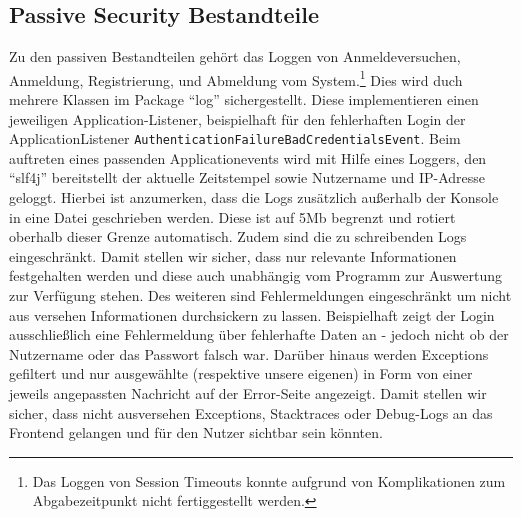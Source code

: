 \subsection{Passive Security Bestandteile}
Zu den passiven Bestandteilen gehört das Loggen von Anmeldeversuchen, Anmeldung, Registrierung, und Abmeldung vom System.\footnote{Das Loggen von Session Timeouts konnte aufgrund von Komplikationen zum Abgabezeitpunkt nicht fertiggestellt werden.}
Dies wird duch mehrere Klassen im Package \enquote{log} sichergestellt. Diese implementieren einen jeweiligen Application-Listener, beispielhaft für den fehlerhaften Login der ApplicationListener \texttt{AuthenticationFailureBadCredentialsEvent}. Beim auftreten eines passenden Applicationevents wird mit Hilfe eines Loggers, den \enquote{slf4j} bereitstellt der aktuelle Zeitstempel sowie Nutzername und IP-Adresse geloggt.
Hierbei ist anzumerken, dass die Logs zusätzlich außerhalb der Konsole in eine Datei geschrieben werden. Diese ist auf 5Mb begrenzt und rotiert oberhalb dieser Grenze automatisch.
Zudem sind die zu schreibenden Logs eingeschränkt.
Damit stellen wir sicher, dass nur relevante Informationen festgehalten werden und diese auch unabhängig vom Programm zur Auswertung zur Verfügung stehen.
Des weiteren sind Fehlermeldungen eingeschränkt um nicht aus versehen Informationen durchsickern zu lassen. Beispielhaft zeigt der Login ausschließlich eine Fehlermeldung über fehlerhafte Daten an - jedoch nicht ob der Nutzername oder das Passwort falsch war.
Darüber hinaus werden Exceptions gefiltert und nur ausgewählte (respektive unsere eigenen) in Form von einer jeweils angepassten Nachricht auf der Error-Seite angezeigt. Damit stellen wir sicher, dass nicht ausversehen Exceptions, Stacktraces oder Debug-Logs an das Frontend gelangen und für den Nutzer sichtbar sein könnten.
